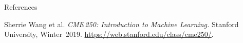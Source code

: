 \begin{frame}[allowframebreaks]{References}
\begin{thebibliography}{99}

Sherrie Wang et al. \emph{CME 250: Introduction to Machine Learning.} Stanford University, Winter 2019. \href{https://web.stanford.edu/class/cme250/}{https://web.stanford.edu/class/cme250/}.

\end{thebibliography}
\end{frame}
